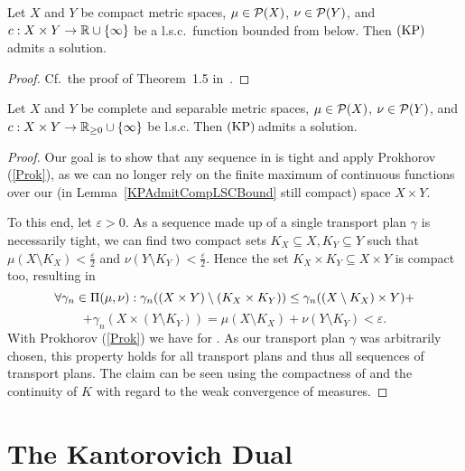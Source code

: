 \begin{lemma}\label{KPAdmitCompLSCBound}
	Let $X$ and $Y$ be compact metric spaces, $\mu \in \PM{X}$, $\nu \in \PM{Y}$, and $\map[c]{X \times Y}{\R \cup \{ \infty \}}$ be a l.s.c.\ function bounded from below. Then$\text{\normalfont\ (KP)\,}$admits a solution.
\end{lemma}

\begin{proof}
	Cf.~the proof of Theorem~1.5 in~\cite{San2015}.
\end{proof}

\begin{theorem}\label{KPAdmitPolishLSC}
	Let $X$ and $Y$ be complete and separable metric spaces, $\mu \in \PM{X}$, $\nu \in \PM{Y}$, and $\map[c]{X \times Y}{\RZero \cup \{ \infty \}}$ be l.s.c. Then$\text{\normalfont\ (KP)\,}$admits a solution.
\end{theorem}

\begin{proof}
	Our goal is to show that any sequence in \TP{\mu}{\nu} is tight and apply Prokhorov (\ref{Prok}), as we can no longer rely on the finite maximum of continuous functions over our (in Lemma~\ref{KPAdmitCompLSCBound} still compact) space $X \times Y$.

	To this end, let $\varepsilon > 0$. As a sequence made up of a single transport plan $\gamma$ is necessarily tight, we can find two compact sets $K_X \subseteq X, K_Y \subseteq Y$ such that $\mu(X \setminus K_X) < \frac{\varepsilon}{2}$ and $\nu(Y \setminus K_Y) < \frac{\varepsilon}{2}$. Hence the set $K_X \times K_Y \subseteq X \times Y$ is compact too, resulting in
	\[ \forall \gamma_n \in \TP{\mu}{\nu}: \gamma_n((X \times Y) \setminus (K_X \times K_Y)) \le \gamma_n ((X \setminus K_X) \times Y) + \]
	\[ + \gamma_n(X \times (Y \setminus K_Y)) = \mu(X \setminus K_X) + \nu(Y \setminus K_Y) < \varepsilon. \]
	With Prokhorov (\ref{Prok}) we have  for \Ninf. As our transport plan $\gamma$ was arbitrarily chosen, this property holds for all transport plans and thus all sequences of transport plans. The claim can be seen using the compactness of \TP{\mu}{\nu} and the continuity of $K$ with regard to the weak convergence of measures.
\end{proof}

\section{The Kantorovich Dual}\label{KanDual}


